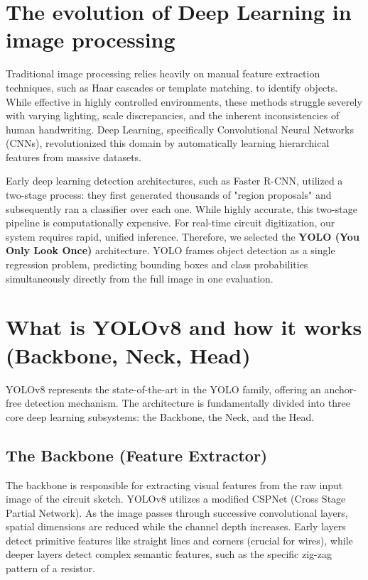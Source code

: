 \section{The evolution of Deep Learning in image processing}
Traditional image processing relies heavily on manual feature extraction techniques, such as Haar cascades or template matching, to identify objects. While effective in highly controlled environments, these methods struggle severely with varying lighting, scale discrepancies, and the inherent inconsistencies of human handwriting. Deep Learning, specifically Convolutional Neural Networks (CNNs), revolutionized this domain by automatically learning hierarchical features from massive datasets.

Early deep learning detection architectures, such as Faster R-CNN, utilized a two-stage process: they first generated thousands of "region proposals" and subsequently ran a classifier over each one. While highly accurate, this two-stage pipeline is computationally expensive. For real-time circuit digitization, our system requires rapid, unified inference. Therefore, we selected the \textbf{YOLO (You Only Look Once)} architecture. YOLO frames object detection as a single regression problem, predicting bounding boxes and class probabilities simultaneously directly from the full image in one evaluation.

\section{What is YOLOv8 and how it works (Backbone, Neck, Head)}
YOLOv8 represents the state-of-the-art in the YOLO family, offering an anchor-free detection mechanism. The architecture is fundamentally divided into three core deep learning subsystems: the Backbone, the Neck, and the Head.

\subsection{The Backbone (Feature Extractor)}
The backbone is responsible for extracting visual features from the raw input image of the circuit sketch. YOLOv8 utilizes a modified CSPNet (Cross Stage Partial Network). As the image passes through successive convolutional layers, spatial dimensions are reduced while the channel depth increases. Early layers detect primitive features like straight lines and corners (crucial for wires), while deeper layers detect complex semantic features, such as the specific zig-zag pattern of a resistor.

